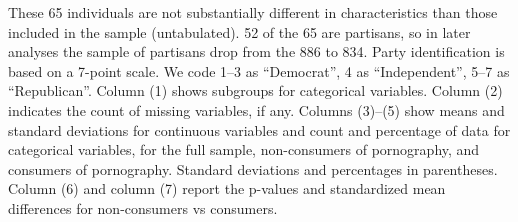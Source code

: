 \documentclass[12pt, letterpaper]{article}
\begin{document}
\begin{table}[ht]
{		These 65 individuals are not substantially different in characteristics than those included in the sample (untabulated).
		52 of the 65 are partisans, so in later analyses the sample of partisans drop from the 886 to 834.
		Party identification is based on a 7-point scale. We code 1--3 as ``Democrat'', 4 as ``Independent'', 5--7 as ``Republican''.
		Column (1) shows subgroups for categorical variables.
		Column (2) indicates the count of missing variables, if any.
		Columns (3)--(5) show means and standard deviations for continuous variables and count and percentage of data for categorical variables, for the full sample, non-consumers of pornography, and consumers of pornography.
		Standard deviations and percentages in parentheses.
		Column (6) and column (7) report the p-values and standardized mean differences for non-consumers vs consumers.
	}
\end{table}
\end{document}
